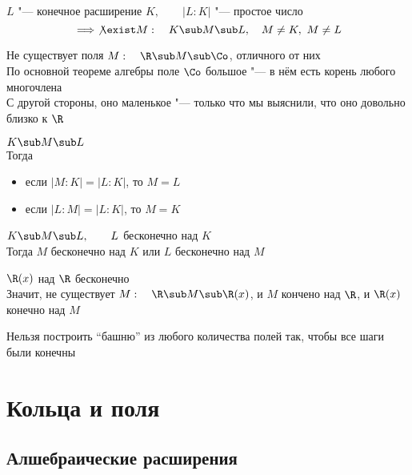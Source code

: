 \begin{implication}
	$ L $ "--- конечное расширение $ K, \qquad |L : K| $ "--- простое число
	$$ \implies \not\exist M : \quad K \sub M \sub L, \quad M \ne K, ~ M \ne L $$
\end{implication}

\begin{eg}
	Не существует поля $ M : \quad \R \sub M \sub \Co $, отличного от них \\
	По основной теореме алгебры поле $ \Co $ большое "--- в нём есть корень любого многочлена \\
	С другой стороны, оно маленькое "--- только что мы выяснили, что оно довольно близко к $ \R $
\end{eg}

\begin{implication}
	$ K \sub M \sub L $ \\
	Тогда
	\begin{itemize}
		\item если $ |M : K| = |L : K| $, то $ M = L $
		\item если $ |L : M| = |L : K| $, то $ M = K $
	\end{itemize}
\end{implication}

\begin{implication}
	$ K \sub M \sub L, \qquad L $ бесконечно над $ K $ \\
	Тогда $ M $ бесконечно над $ K $ или $ L $ бесконечно над $ M $
\end{implication}

\begin{eg}
	$ \R(x) $ над $ \R $ бесконечно \\
	Значит, не существует $ M : \quad \R \sub M \sub \R(x) $, и $ M $ кончено над $ \R $, и $ \R(x) $ конечно над $ M $
\end{eg}

\begin{remark}
	Нельзя построить ``башню'' из любого количества полей так, чтобы все шаги были конечны
\end{remark}


\chapter{Кольца и поля}

\section{Алшебраические расширения}

